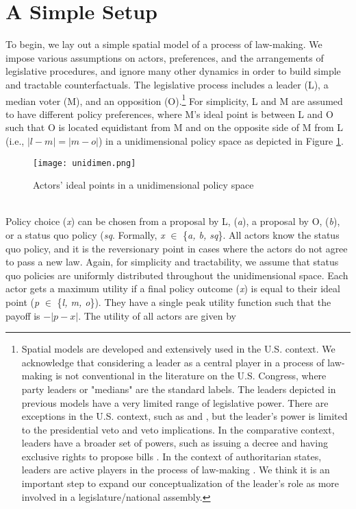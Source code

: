 \documentclass[12pt]{article}
\theoremstyle{plain}		      \newtheorem{assn}{Assumption}
\theoremstyle{plain}		      \newtheorem{prop}{Proposition}
\theoremstyle{plain}		      \newtheorem{lemma}{Lemma}
\theoremstyle{plain}	          \newtheorem{imp}{Implication}
\theoremstyle{plain}	          \newtheorem{hyp}{Hypothesis}
\theoremstyle{definition}		  \newtheorem{defn}{Definition}
\theoremstyle{remark}	          \newtheorem{rem}{Remark}
\theoremstyle{definition}         \newtheorem{case}{Case}
\begin{document}
\section{A Simple Setup}
\indent To begin, we lay out a simple spatial model of a process of law-making. We impose various assumptions on actors, preferences, and the arrangements of legislative procedures, and ignore many other dynamics in order to build simple and tractable counterfactuals. The legislative process includes a leader (L), a median voter (M), and an opposition (O).\footnote{Spatial models are developed and extensively used in the U.S. context. We acknowledge that considering a leader as a central player in a process of law-making is not conventional in the literature on the U.S. Congress, where party leaders or "medians" are the standard labels. The leaders depicted in previous models have a very limited range of legislative power. There are exceptions in the U.S. context, such as \cite{krehbiel99} and \cite{cameron00a}, but the leader's power is limited to the presidential veto and veto implications. In the comparative context, leaders have a broader set of powers, such as issuing a decree \citep{netoetal03} and having exclusive rights to propose bills \citep{barkan09}. In the context of authoritarian states, leaders are active players in the process of law-making \citep{gandhi08, truex16, malesky10, barkan09}. We think it is an important step to expand our conceptualization of the leader's role as more involved in a legislature/national assembly.} For simplicity, L and M are assumed to have different policy preferences, where M's ideal point is between L and O such that O is located equidistant from M and on the opposite side of M from L (i.e., $|l-m| =|m-o|$) in a unidimensional policy space as depicted in Figure \ref{unidimen}. 
\begin{figure}[h]
\centering
\texttt{[image: unidimen.png]}
\caption{Actors' ideal points in a unidimensional policy space}
\label{unidimen} 
\end{figure}
\\
\indent Policy choice (\textit{x}) can be chosen from a proposal by L, (\textit{a}), a proposal by O, (\textit{b}), or a status quo policy (\textit{sq}. Formally, \textit{x} $\in$ \{\textit{a, b, sq}\}. All actors know the status quo policy, and it is the reversionary point in cases where the actors do not agree to pass a new law. Again, for simplicity and tractability, we assume that status quo policies are uniformly distributed throughout the unidimensional space. Each actor gets a maximum utility if a final policy outcome (\textit{x}) is equal to their ideal point (\textit{p} $\in$ \{\textit{l, m, o}\}). They have a single peak utility function such that the payoff is $-|p-x|$. The utility of all actors are given by
\end{document}
